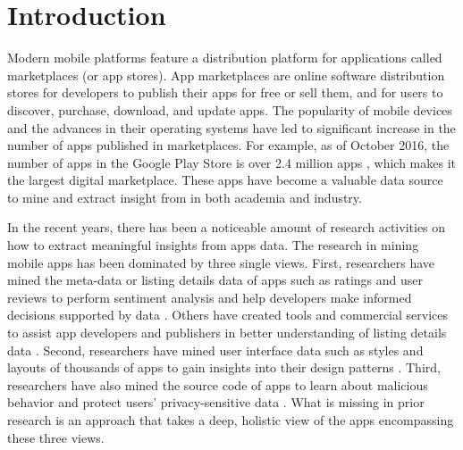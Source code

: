 \chapter{Introduction}
\label{ch:intro__chapter}
Modern mobile platforms feature a distribution platform for applications called marketplaces (or app stores).
App marketplaces are online software distribution stores for developers to publish their apps for free or sell them, and for users to discover, purchase, download, and update apps.
The popularity of mobile devices and the advances in their operating systems have led to significant increase in the number of apps published in marketplaces.
For example, as of October 2016, the number of apps in the Google Play Store is over 2.4 million apps \cite{appbrain_play_apps}, which makes it the largest digital marketplace.
These apps have become a valuable data source to mine and extract insight from in both academia and industry.

In the recent years, there has been a noticeable amount of research activities on how to extract meaningful insights from apps data. 
The research in mining mobile apps has been dominated by three single views.
First, researchers have mined the meta-data or listing details data of apps such as ratings and user reviews to perform sentiment analysis and help developers make informed decisions supported by data \cite{fu_2013_KDD,chen_2014_ICSE,kong_2015_CCS}. 
Others have created tools and commercial services to assist app developers and publishers in better understanding of listing details data \cite{appfigures,applause,appannie}.
Second, researchers have mined user interface data such as styles and layouts of thousands of apps to gain insights into their design patterns \cite{shirazi_EICS_2013,Alharbi_2015_MobileHCI}.
Third, researchers have also mined the source code of apps to learn about malicious behavior and protect users' privacy-sensitive data \cite{zhou_2012_SP_dissecting,lu_2012_CCS,Arzt_2014_PLDI}.
What is missing in prior research is an approach that takes a deep, holistic view of the apps encompassing these three views.

